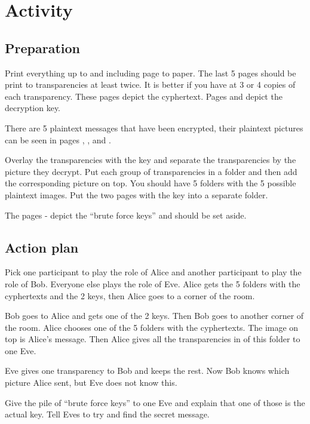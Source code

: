 \documentclass[a4paper,10pt]{article}
\begin{document}
\newpage

\section{Activity}

\subsection{Preparation}

Print everything up to and including page \pageref{pg_last_paper_printed} to paper. The last 5 pages should be print to transparencies at least twice. It is better if you have at 3 or 4 copies of each transparency. These pages depict the cyphertext. Pages \pageref{pg_key_1} and \pageref{pg_key_2} depict the decryption key. 


There are 5 plaintext messages that have been encrypted, their plaintext pictures can be seen in pages \pageref{pg_circle}, \pageref{pg_cross}, \pageref{pg_square} \pageref{pg_triangle} and \pageref{pg_X}.

Overlay the transparencies with the key and separate the transparencies by the picture they decrypt. Put each group of transparencies in a folder and then add the corresponding picture on top. You should have 5 folders with the 5 possible plaintext images. Put the two pages with the key into a separate folder.

The pages \pageref{pg_BF_keys_start}-\pageref{pg_BF_keys_finish} depict the ``brute force keys'' and should be set aside.

\subsection{Action plan}

Pick one participant to play the role of Alice and another participant to play the role of Bob. Everyone else plays the role of Eve. Alice gets the 5 folders with the cyphertexts and the 2 keys, then Alice goes to a corner of the room.

Bob goes to Alice and gets one of the 2 keys. Then Bob goes to another corner of the room.
Alice chooses one of the 5 folders with the cyphertexts. The image on top is Alice's message. Then Alice gives all the transparencies in of this folder to one Eve.

Eve gives one transparency to Bob and keeps the rest. Now Bob knows which picture Alice sent, but Eve does not know this.

Give the pile of ``brute force keys'' to one Eve and explain that one of those is the actual key. Tell Eves to try and find the secret message.
\end{document}
